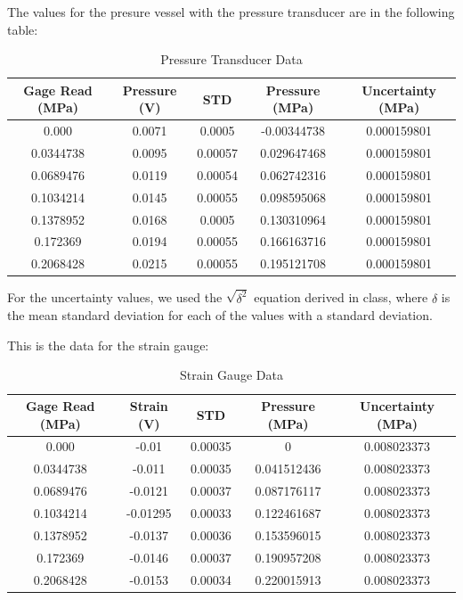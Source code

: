 \documentclass{article}
\begin{document}
The values for the presure vessel with the pressure transducer are in the following table:

\begin{table}[H]
  \centering
  \caption{Pressure Transducer Data}
  \label{tab:pressure-transducer-data}
  \begin{tabular}{|c|c|c|c|c|}
  \hline
  Gage Read (MPa) & Pressure (V) & STD & Pressure (MPa) & Uncertainty (MPa) \\
  \hline
  0.000 & 0.0071 & 0.0005 & -0.00344738 & 0.000159801 \\
  0.0344738 & 0.0095 & 0.00057 & 0.029647468 & 0.000159801 \\
  0.0689476 & 0.0119 & 0.00054 & 0.062742316 & 0.000159801 \\
  0.1034214 & 0.0145 & 0.00055 & 0.098595068 & 0.000159801 \\
  0.1378952 & 0.0168 & 0.0005 & 0.130310964 & 0.000159801 \\
  0.172369 & 0.0194 & 0.00055 & 0.166163716 & 0.000159801 \\
  0.2068428 & 0.0215 & 0.00055 & 0.195121708 & 0.000159801 \\
  \hline
  \end{tabular}
\end{table}

For the uncertainty values, we used the $\sqrt{\delta^2}$ equation derived in class, where $\delta$ is the mean standard deviation for each of the values with a standard deviation.

This is the data for the strain gauge:

\begin{table}[H]
  \centering
  \caption{Strain Gauge Data}
  \label{tab:strain-gauge-data}
  \begin{tabular}{|c|c|c|c|c|}
  \hline
  Gage Read (MPa) & Strain (V) & STD & Pressure (MPa) & Uncertainty (MPa) \\
  \hline
  0.000 & -0.01 & 0.00035 & 0 & 0.008023373 \\
  0.0344738 & -0.011 & 0.00035 & 0.041512436 & 0.008023373 \\
  0.0689476 & -0.0121 & 0.00037 & 0.087176117 & 0.008023373 \\
  0.1034214 & -0.01295 & 0.00033 & 0.122461687 & 0.008023373 \\
  0.1378952 & -0.0137 & 0.00036 & 0.153596015 & 0.008023373 \\
  0.172369 & -0.0146 & 0.00037 & 0.190957208 & 0.008023373 \\
  0.2068428 & -0.0153 & 0.00034 & 0.220015913 & 0.008023373 \\
  \hline
  \end{tabular}
\end{table}
\end{document}
